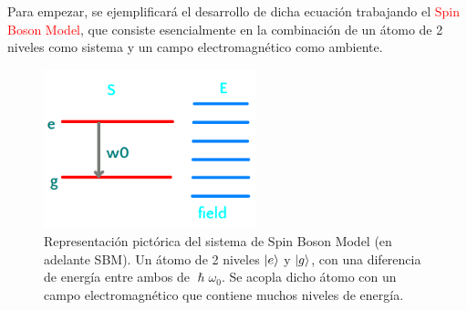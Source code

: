\documentclass{book}
\begin{document}
Para empezar, se ejemplificará el desarrollo de dicha ecuación trabajando el \textcolor{red}{Spin Boson Model}, que consiste esencialmente en la combinación de un átomo de 2 niveles como sistema y un campo electromagnético como ambiente.
\begin{figure}[ht]
\includegraphics[width=0.55\textwidth]{sbm.png}
\caption{Representación pictórica del sistema de Spin Boson Model (en adelante SBM). Un átomo de 2 niveles $\ket{e}$ y $\ket{g}$, con una diferencia de energía entre ambos de $\hslash\omega_0$. Se acopla dicho átomo con un campo electromagnético que contiene muchos niveles de energía.}
\end{figure} 
\end{document}

